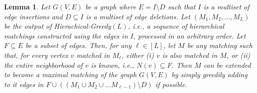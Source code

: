 \documentclass[11pt,a4paper]{article}
\newtheorem{lemma}{Lemma}
\begin{document}
\begin{lemma}\label{lem:key-1}
Let $G(V,E)$ be a graph where $E = I \setminus D$ such that $I$ is a multiset of edge insertions and $D \subseteq I$ is a multiset of edge deletions. Let $(M_1, M_2, \dots, M_{L})$ be the output of \textsf{Hierachical-Greedy}$(L)$, i.e., a sequence of hierarchical matchings constructed using the edges in $I$, processed in an arbitrary order. Let $F \subseteq E$ be a subset of edges. Then, for any $\ell \in [L]$, let $M$ be any matching such that, for every vertex $v$ matched in $M_{\ell}$, either (i) $v$ is also matched in $M$, or (ii) the entire neighborhood of $v$ is known, i.e., $N(v) \subseteq F$. %
Then $M$ can be extended to become a maximal matching of the graph $G(V,E)$ by simply greedily adding to it edges in $F \cup \left( (M_1 \cup M_2 \cup ... M_{\ell-1}) \setminus D \right)$ if possible.
\end{lemma}
\end{document}
